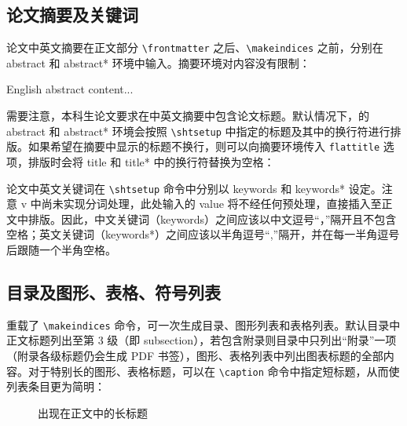 \documentclass[bachelor, comfort]{shtthesis}
\begin{document}
\subsection{论文摘要及关键词}
论文中英文摘要在正文部分 \verb|\frontmatter| 之后、\verb|\makeindices| 之前，分别在 abstract 和 abstract* 环境中输入。摘要环境对内容没有限制：
\begin{latex}
\begin{abstract}
  中文摘要内容...
\end{abstract}

\begin{abstract*}
  English abstract content...
\end{abstract*}
\end{latex}

需要注意，本科生论文要求在中英文摘要中包含论文标题。默认情况下，\shtthesis 的 abstract 和 abstract* 环境会按照 \verb|\shtsetup| 中指定的标题及其中的换行符进行排版。如果希望在摘要中显示的标题不换行，则可以向摘要环境传入 \verb|flattitle| 选项，排版时会将 title 和 title* 中的换行符替换为空格：
\begin{latex}
\begin{abstract}[flattitle]
  中文摘要内容...
\end{abstract}
\end{latex}

论文中英文关键词在 \verb|\shtsetup| 命令中分别以 keywords 和 keywords* 设定。注意 \shtthesis{} v\version{} 中尚未实现分词处理，此处输入的 value 将不经任何预处理，直接插入至正文中排版。因此，中文关键词（keywords）之间应该以中文逗号“，”隔开且不包含空格；英文关键词（keywords*）之间应该以半角逗号“,”隔开，并在每一半角逗号后跟随一个半角空格。
\begin{latex}
\end{latex}

\subsection{目录及图形、表格、符号列表}
\shtthesis{} 重载了 \verb|\makeindices| 命令，可一次生成目录、图形列表和表格列表。默认目录中正文标题列出至第 3 级（即 subsection），若包含附录则目录中只列出“附录”一项（附录各级标题仍会生成 PDF 书签），图形、表格列表中列出图表标题的全部内容。对于特别长的图形、表格标题，可以在 \verb|\caption| 命令中指定短标题，从而使列表条目更为简明：
\begin{latex}
\begin{figure}
  \caption[出现在图形列表内的短标题]{出现在正文中的长标题}
\end{figure}
\end{latex}
\end{document}
